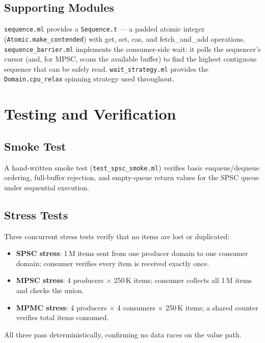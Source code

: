 \documentclass[11pt,a4paper]{article}
\begin{document}
\subsection{Supporting Modules}

\texttt{sequence.ml} provides a \texttt{Sequence.t} --- a padded atomic integer
(\texttt{Atomic.make\_contended}) with get, set, cas, and fetch\_and\_add operations.
\texttt{sequence\_barrier.ml} implements the consumer-side wait: it polls the sequencer's
cursor (and, for MPSC, scans the available buffer) to find the highest contiguous
sequence that can be safely read. \texttt{wait\_strategy.ml} provides the
\texttt{Domain.cpu\_relax} spinning strategy used throughout.

\section{Testing and Verification}
\label{sec:testing}

\subsection{Smoke Test}

A hand-written smoke test (\texttt{test\_spsc\_smoke.ml}) verifies basic
enqueue/dequeue ordering, full-buffer rejection, and empty-queue return values
for the SPSC queue under sequential execution.

\subsection{Stress Tests}

Three concurrent stress tests verify that no items are lost or duplicated:
\begin{itemize}[noitemsep]
  \item \textbf{SPSC stress}: 1\,M items sent from one producer domain to one consumer domain; consumer verifies every item is received exactly once.
  \item \textbf{MPSC stress}: 4 producers $\times$ 250\,K items; consumer collects all 1\,M items and checks the union.
  \item \textbf{MPMC stress}: 4 producers $\times$ 4 consumers $\times$ 250\,K items; a shared counter verifies total items consumed.
\end{itemize}
All three pass deterministically, confirming no data races on the value path.
\end{document}
